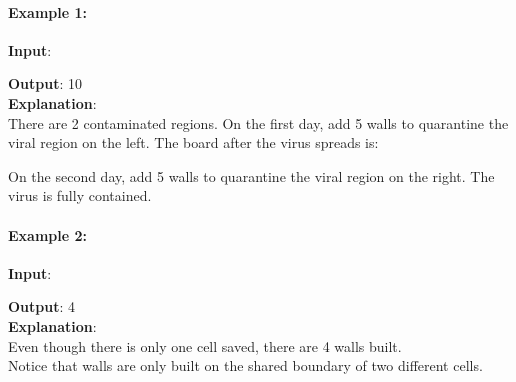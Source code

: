 \documentclass[a4paper,12pt]{article}
\begin{document}
\paragraph{Example 1:}
\begin{flushleft}
\textbf{Input}:
\begin{figure}[H]
\end{figure}
\textbf{Output}: 10
\\
\textbf{Explanation}:
\\
There are 2 contaminated regions. On the first day, add 5 walls to quarantine the viral region on the left. The board after the virus spreads is:
\begin{figure}[H]
\end{figure}
On the second day, add 5 walls to quarantine the viral region on the right. The virus is fully contained.
\end{flushleft}
\paragraph{Example 2:}
\begin{flushleft}
\textbf{Input}:
\begin{figure}[H]
\end{figure}
\textbf{Output}: 4
\\
\textbf{Explanation}: 
\\
Even though there is only one cell saved, there are 4 walls built.
\\
Notice that walls are only built on the shared boundary of two different cells.
\end{flushleft}
\end{document}
